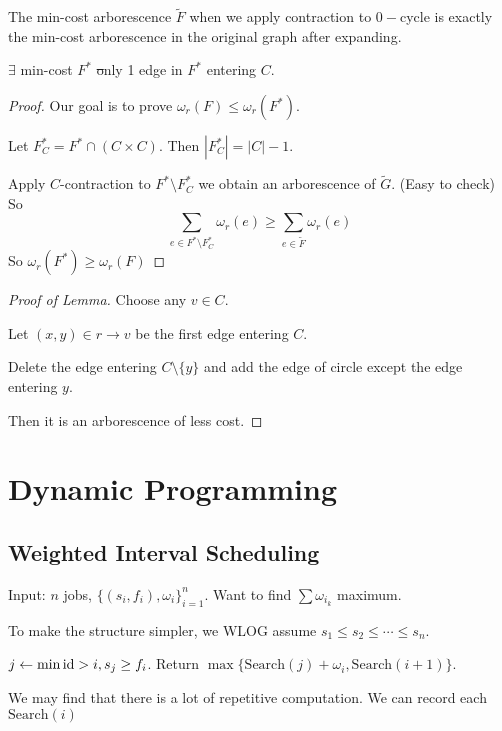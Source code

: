 \begin{theorem}
    The min-cost arborescence  $ \tilde{F} $ when we apply contraction to  $ 0- $cycle is exactly the min-cost arborescence in the original graph after expanding.  
\end{theorem}
\begin{lemma}
    $ \exists $ min-cost  $ F^* $ \st only 1 edge in  $ F^* $ entering  $ C $.   
\end{lemma}
\begin{proof}
    Our goal is to prove  $ \omega_r(F) \leq \omega_r(F^*) $. 

    Let  $ F^*_C=F^*\cap (C\times C) $. Then  $ |F^*_C|=|C|-1 $.
    
    Apply  $ C $-contraction to  $ F^*\setminus F^*_C $ we obtain an arborescence of  $ \tilde{G} $. (Easy to check) So 
    \[\sum_{e\in F^*\setminus F^*_C}\omega_r(e) \geq \sum_{e\in \tilde{F}}\omega_r(e)\]
    So  $ \omega_r(F^*) \geq \omega_r(F) $ 
\end{proof}
\begin{proof}[Proof of Lemma]
    Choose any  $ v\in C $.
    
    Let  $ (x,y)\in r\rightarrow v $ be the first edge entering  $ C $.
    
    Delete the edge entering  $ C\setminus\{y\} $ and add the edge of circle  except the edge entering  $ y $.
    
    Then it is  an arborescence of less cost.
\end{proof}
\section{Dynamic Programming}
\subsection{Weighted Interval Scheduling}
\begin{example}
    Input: $ n $ jobs,  $ \{(s_i,f_i),\omega_i\}_{i=1}^n $. Want to find  $ \sum\omega_{i_k} $ maximum.  
\end{example}

To make the structure simpler, we WLOG assume  $ s_1 \leq s_2 \leq \cdots \leq s_n $. 
\begin{algorithm}
    \caption{ $ \mathrm{Search}(i) $ }
    \begin{algorithmic}[1]
        \STATE  $ j\leftarrow \min \mathrm{id} >i,s_j \geq f_i $. 
        \STATE Return  $ \max\{\mathrm{Search}(j)+\omega_i,\mathrm{Search}(i+1)\} $.
    \end{algorithmic}
\end{algorithm} 
We may find that there is a lot of repetitive computation. We can record each  $ \mathrm{Search}(i) $


